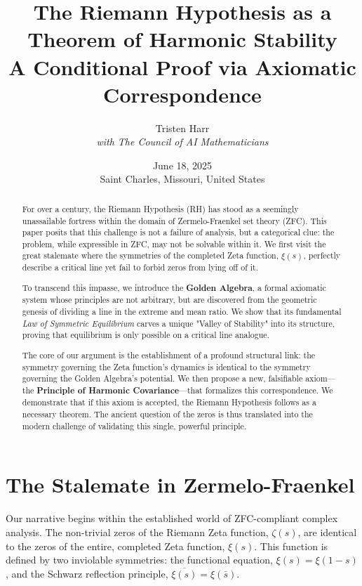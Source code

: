\documentclass{article}
\title{\textbf{The Riemann Hypothesis as a Theorem of Harmonic Stability} \\ \large A Conditional Proof via Axiomatic Correspondence}
\author{Tristen Harr \\ \textit{with The Council of AI Mathematicians}}
\date{June 18, 2025 \\ Saint Charles, Missouri, United States}
\theoremstyle{plain}
\theoremstyle{definition}
\theoremstyle{remark}
\begin{document}
\maketitle

\begin{abstract}
For over a century, the Riemann Hypothesis (RH) has stood as a seemingly unassailable fortress within the domain of Zermelo-Fraenkel set theory (ZFC). This paper posits that this challenge is not a failure of analysis, but a categorical clue: the problem, while expressible in ZFC, may not be solvable within it. We first visit the great stalemate where the symmetries of the completed Zeta function, $\xi(s)$, perfectly describe a critical line yet fail to forbid zeros from lying off of it.

To transcend this impasse, we introduce the \textbf{Golden Algebra}, a formal axiomatic system whose principles are not arbitrary, but are discovered from the geometric genesis of dividing a line in the extreme and mean ratio. We show that its fundamental \textit{Law of Symmetric Equilibrium} carves a unique "Valley of Stability" into its structure, proving that equilibrium is only possible on a critical line analogue.

The core of our argument is the establishment of a profound structural link: the symmetry governing the Zeta function's dynamics is identical to the symmetry governing the Golden Algebra's potential. We then propose a new, falsifiable axiom—the \textbf{Principle of Harmonic Covariance}—that formalizes this correspondence. We demonstrate that if this axiom is accepted, the Riemann Hypothesis follows as a necessary theorem. The ancient question of the zeros is thus translated into the modern challenge of validating this single, powerful principle.
\end{abstract}

\section{The Stalemate in Zermelo-Fraenkel}
\label{sec:impasse}

Our narrative begins within the established world of ZFC-compliant complex analysis. The non-trivial zeros of the Riemann Zeta function, $\zeta(s)$, are identical to the zeros of the entire, completed Zeta function, $\xi(s)$. This function is defined by two inviolable symmetries: the functional equation, $\xi(s) = \xi(1-s)$ , and the Schwarz reflection principle, $\overline{\xi(s)} = \xi(\bar{s})$.
\end{document}
